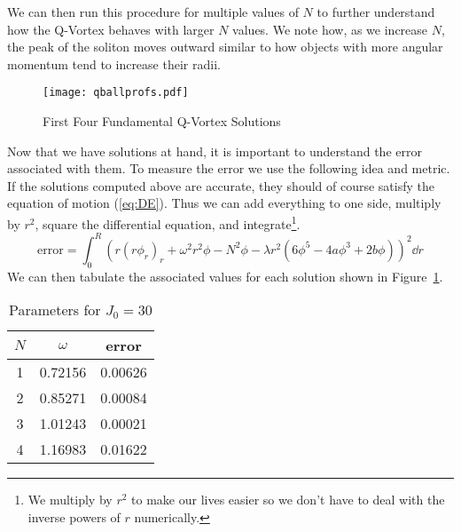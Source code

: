 We can then run this procedure for multiple values of \(N\) to further
understand how the Q-Vortex behaves with larger \(N\) values. We note how, as we
increase \(N\), the peak of the soliton moves outward similar to how objects
with more angular momentum tend to increase their radii.
\begin{figure}[H]
    \centering
    \texttt{[image: qballprofs.pdf]}
    \caption{First Four Fundamental Q-Vortex Solutions}\label{fig:profiles}
\end{figure}
Now that we have solutions at hand, it is important to understand the error
associated with them. To measure the error we use the following idea and metric.
If the solutions computed above are accurate, they should of course satisfy the
equation of motion (\ref{eq:DE}). Thus we can add everything to one side,
multiply by \(r^2\), square the differential equation, and integrate\footnote{We
multiply by \(r^2\) to make our lives easier so we don't have to deal with the
inverse powers of \(r\) numerically.}.
\begin{equation}
    \mathrm{error} = \int_0^R \left(r\left(r\phi_{r}\right)_r + \omega^2r^2\phi - N^2\phi - \lambda r^2\left(6\phi^5 - 4a\phi^3 + 2b\phi\right)\right)^2\dd{r}
\end{equation}
We can then tabulate the associated values for each solution shown in
Figure~\ref{fig:profiles}.
\begin{table}[H]
    \centering
    \begin{tabular}{c c c}            \toprule
        \(N\) & \(\omega\) & error   \\ \midrule
        1     & 0.72156    & 0.00626 \\ \midrule
        2     & 0.85271    & 0.00084 \\ \midrule
        3     & 1.01243    & 0.00021 \\ \midrule
        4     & 1.16983    & 0.01622 \\ \bottomrule
    \end{tabular}
    \caption{Parameters for \(J_0 = 30\)}\label{tab:params}
\end{table}

